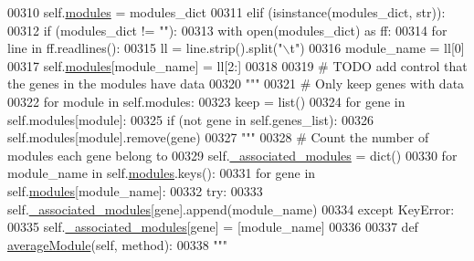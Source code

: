 \begin{DoxyCode}
00310             self.\hyperlink{classnavicom_1_1navicom_1_1NaviCom_a56141660ddf29a36a8291e938246578c}{modules} = modules\_dict 
00311         \textcolor{keywordflow}{elif} (isinstance(modules\_dict, str)):
00312             \textcolor{keywordflow}{if} (modules\_dict != \textcolor{stringliteral}{""}):
00313                 with open(modules\_dict) \textcolor{keyword}{as} ff:
00314                     \textcolor{keywordflow}{for} line \textcolor{keywordflow}{in} ff.readlines():
00315                         ll = line.strip().split(\textcolor{stringliteral}{"\(\backslash\)t"})
00316                         module\_name = ll[0]
00317                         self.\hyperlink{classnavicom_1_1navicom_1_1NaviCom_a56141660ddf29a36a8291e938246578c}{modules}[module\_name] = ll[2:]
00318 
00319         \textcolor{comment}{# TODO add control that the genes in the modules have data}
00320         \textcolor{stringliteral}{"""}
00321 \textcolor{stringliteral}{        # Only keep genes with data}
00322 \textcolor{stringliteral}{        for module in self.modules:}
00323 \textcolor{stringliteral}{            keep = list()}
00324 \textcolor{stringliteral}{            for gene in self.modules[module]:}
00325 \textcolor{stringliteral}{                if (not gene in self.genes\_list):}
00326 \textcolor{stringliteral}{                    self.modules[module].remove(gene)}
00327 \textcolor{stringliteral}{        """}
00328         \textcolor{comment}{# Count the number of modules each gene belong to}
00329         self.\hyperlink{classnavicom_1_1navicom_1_1NaviCom_abc04e5310dba9a8c2dd2037281464727}{_associated_modules} = dict()
00330         \textcolor{keywordflow}{for} module\_name \textcolor{keywordflow}{in} self.\hyperlink{classnavicom_1_1navicom_1_1NaviCom_a56141660ddf29a36a8291e938246578c}{modules}.keys():
00331             \textcolor{keywordflow}{for} gene \textcolor{keywordflow}{in} self.\hyperlink{classnavicom_1_1navicom_1_1NaviCom_a56141660ddf29a36a8291e938246578c}{modules}[module\_name]:
00332                 \textcolor{keywordflow}{try}:
00333                     self.\hyperlink{classnavicom_1_1navicom_1_1NaviCom_abc04e5310dba9a8c2dd2037281464727}{_associated_modules}[gene].append(module\_name)
00334                 \textcolor{keywordflow}{except} KeyError:
00335                     self.\hyperlink{classnavicom_1_1navicom_1_1NaviCom_abc04e5310dba9a8c2dd2037281464727}{_associated_modules}[gene] = [module\_name]
00336 
00337     \textcolor{keyword}{def }\hyperlink{classnavicom_1_1navicom_1_1NaviCom_afd1a299b687bc97e171cff0a738b7b73}{averageModule}(self, method):
00338         \textcolor{stringliteral}{"""}

\end{DoxyCode}
